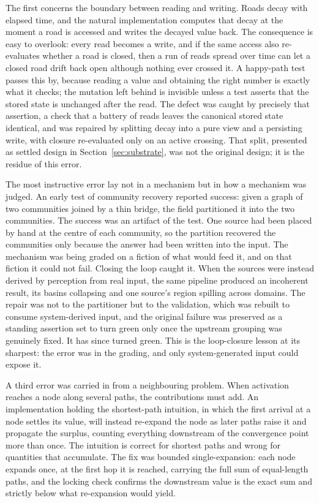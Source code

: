 \documentclass[11pt]{article}
\begin{document}
The first concerns the boundary between reading and writing. Roads decay with elapsed
time, and the natural implementation computes that decay at the moment a road is
accessed and writes the decayed value back. The consequence is easy to overlook: every
read becomes a write, and if the same access also re-evaluates whether a road is closed,
then a run of reads spread over time can let a closed road drift back open although
nothing ever crossed it. A happy-path test passes this by, because reading a value and
obtaining the right number is exactly what it checks; the mutation left behind is
invisible unless a test asserts that the stored state is unchanged after the read. The
defect was caught by precisely that assertion, a check that a battery of reads leaves the
canonical stored state identical, and was repaired by splitting decay into a pure view
and a persisting write, with closure re-evaluated only on an active crossing. That split,
presented as settled design in Section~\ref{sec:substrate}, was not the original design; it is
the residue of this error.

The most instructive error lay not in a mechanism but in how a mechanism was judged. An
early test of community recovery \citep{blondel2008fast, traag2019louvain} reported success: given a graph of two communities
joined by a thin bridge, the field partitioned it into the two communities. The success
was an artifact of the test. One source had been placed by hand at the centre of each
community, so the partition recovered the communities only because the answer had been
written into the input. The mechanism was being graded on a fiction of what would feed
it, and on that fiction it could not fail. Closing the loop caught it. When the sources
were instead derived by perception from real input, the same pipeline produced an
incoherent result, its basins collapsing and one source's region spilling across
domains. The repair was not to the partitioner but to the validation, which was rebuilt
to consume system-derived input, and the original failure was preserved as a standing
assertion set to turn green only once the upstream grouping was genuinely fixed. It has
since turned green. This is the loop-closure lesson at its sharpest: the error was in the
grading, and only system-generated input could expose it.

A third error was carried in from a neighbouring problem. When activation reaches a node
along several paths, the contributions must add. An implementation holding the
shortest-path intuition, in which the first arrival at a node settles its value, will
instead re-expand the node as later paths raise it and propagate the surplus, counting
everything downstream of the convergence point more than once. The intuition is correct
for shortest paths and wrong for quantities that accumulate. The fix was bounded
single-expansion: each node expands once, at the first hop it is reached, carrying the
full sum of equal-length paths, and the locking check confirms the downstream value is
the exact sum and strictly below what re-expansion would yield.
\end{document}
